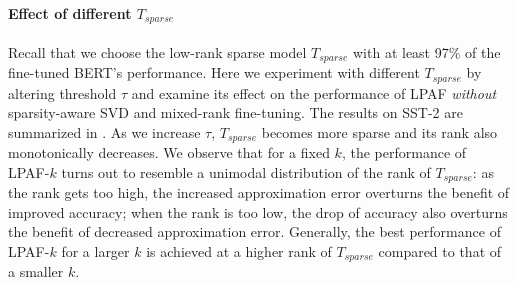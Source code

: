 \paragraph{Effect of different $T_{sparse}$} 
Recall that we choose the low-rank sparse model $T_{sparse}$ with at least 97\% of the fine-tuned BERT's performance. Here we experiment with different $T_{sparse}$ by altering threshold $\tau$ and examine its effect on the performance of LPAF \textit{without} sparsity-aware SVD and mixed-rank fine-tuning.
The results on SST-2 are summarized in . As we increase $\tau$, $T_{sparse}$ becomes more sparse and its rank also monotonically decreases. We observe that for a fixed $k$, the performance of LPAF-$k$ turns out to resemble a unimodal distribution of the rank of $T_{sparse}$: as the rank gets too high, the increased approximation error overturns the benefit of improved accuracy; when the rank is too low, the drop of accuracy also overturns the benefit of decreased approximation error. Generally, the best performance of LPAF-$k$ for a larger $k$ is achieved at a higher rank of $T_{sparse}$ compared to that of a smaller $k$.
